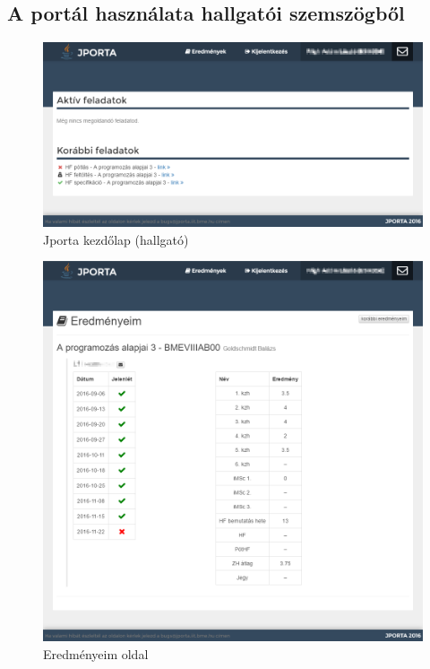 \subsection{A portál használata hallgatói szemszögből}
\begin{figure}[h]
    \centering
    \includegraphics[width=\textwidth]{figures/Jporta-home-h}
    \caption{Jporta kezdőlap (hallgató)}
    \label{figure:jporta-home-h}
\end{figure}
\begin{figure}[h]
    \centering
    \includegraphics[width=\textwidth]{figures/Jporta-results}
    \caption{Eredményeim oldal}
    \label{figure:jporta-results}
\end{figure}

